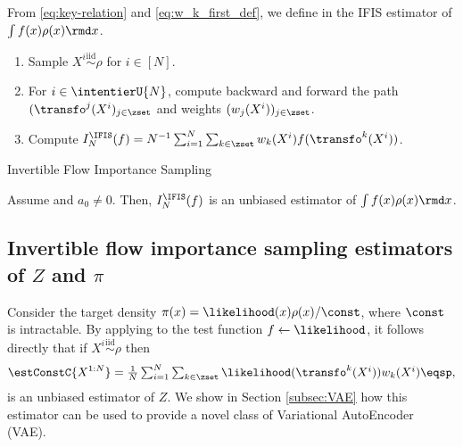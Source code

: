 From \eqref{eq:key-relation} and \eqref{eq:w_k_first_def}, we define  in   the IFIS estimator of $\int f(x) \rho(x) \rmd x$.
\begin{algorithm}
\begin{enumerate}[wide, labelwidth=!, labelindent=0pt, label=(\arabic*)]
\item Sample $X^i \overset{\text{iid}}{\sim} \rho$ for $i\in[N]$.
\item For $i \in \intentierU{N}$, compute backward and forward the
  path $(\transfo^j(X^i)_{j \in\zset}$ and weights $(w_j(X^i))_{j \in\zset}$. 
\item Compute $I^{\IFIS}_N(f) =   N^{-1} \sum_{i=1}^N \sum_{k\in\zset} w_k(X^i)  f(\transfo^k(X^i))$. 
\end{enumerate}
\caption{Invertible Flow Importance Sampling}
\label{algo:IFIS}
\end{algorithm}
\begin{theorem}
\label{theo:importance-sampling}
Assume  and $a_0 \neq 0$. Then, $I^{\IFIS}_N(f)$ is an unbiased estimator of $\int f(x) \rho(x) \rmd x$. 
\end{theorem}


\subsection{Invertible flow importance sampling estimators of $Z$ and $\pi$}\label{subsec:NISestimators}

Consider the target density $\pi(x) = \likelihood(x) \rho(x)/\const$,
where $\const$ is intractable.  
By applying  to
the test function $f \leftarrow \likelihood$, it follows directly that if
$X^{i}\overset{\text{iid}}{\sim}\rho$ then
\begin{equation}
  \label{eq:def_estimator_normal_const}
  \estConstC{X^{1:N}}=\tfrac{1}{N}\textstyle\sum_{i=1}^{N}
  \sum_{k\in \zset}\likelihood(\transfo^{k}(X^i))w_k(X^i) \eqsp,
\end{equation}
is an unbiased estimator of $Z$.  We  show in Section \ref{subsec:VAE} how this estimator can be used to provide a novel class of Variational AutoEncoder (VAE). 

